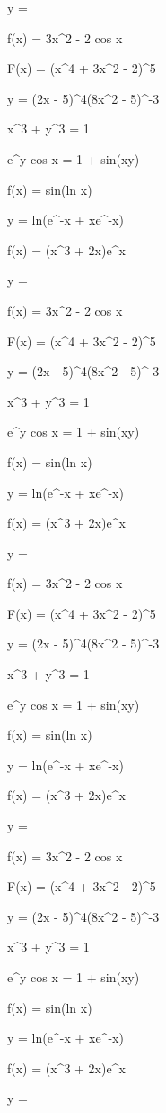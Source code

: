 \documentclass[11pt,a4paper]{article}
\begin{document}
y = 

f(x) = 3x^2 - 2 cos x


 F(x) = (x^4 + 3x^2 - 2)^5

 y = (2x - 5)^4(8x^2 - 5)^{-3}

 x^3 + y^3 = 1

 e^y cos x = 1 + sin(xy)

 f(x) = sin(ln x)

 y = ln(e^{-x} + xe^{-x})

f(x) = (x^3 + 2x)e^x

y = 

f(x) = 3x^2 - 2 cos x


 F(x) = (x^4 + 3x^2 - 2)^5

 y = (2x - 5)^4(8x^2 - 5)^{-3}

 x^3 + y^3 = 1

 e^y cos x = 1 + sin(xy)

 f(x) = sin(ln x)

 y = ln(e^{-x} + xe^{-x})

f(x) = (x^3 + 2x)e^x

y = 

f(x) = 3x^2 - 2 cos x


 F(x) = (x^4 + 3x^2 - 2)^5

 y = (2x - 5)^4(8x^2 - 5)^{-3}

 x^3 + y^3 = 1

 e^y cos x = 1 + sin(xy)

 f(x) = sin(ln x)

 y = ln(e^{-x} + xe^{-x})

f(x) = (x^3 + 2x)e^x

y = 

f(x) = 3x^2 - 2 cos x


 F(x) = (x^4 + 3x^2 - 2)^5

 y = (2x - 5)^4(8x^2 - 5)^{-3}

 x^3 + y^3 = 1

 e^y cos x = 1 + sin(xy)

 f(x) = sin(ln x)

 y = ln(e^{-x} + xe^{-x})

f(x) = (x^3 + 2x)e^x

y = 
\end{document}
